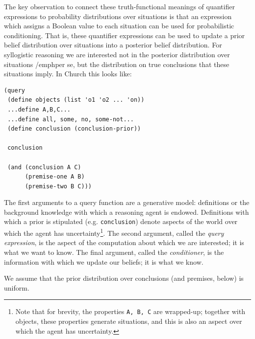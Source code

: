 \documentclass[10pt,letterpaper]{article}
\begin{document}
The key observation to connect these truth-functional meanings of quantifier expressions to probability distributions over situations is that an expression which assigns a Boolean value to each situation can be used for probabilistic conditioning. That is, these quantifier expressions can be used to update a prior belief distribution over situations into a posterior belief distribution. For syllogistic reasoning we are interested not in the posterior distribution over situations /emph{per se}, but the distribution on true conclusions that these situations imply. In Church this looks like:
\begin{lstlisting}
(query
 (define objects (list 'o1 'o2 ... 'on))
 ...define A,B,C...
 ...define all, some, no, some-not...
 (define conclusion (conclusion-prior))
 
 conclusion
 
 (and (conclusion A C) 
      (premise-one A B)
      (premise-two B C)))
\end{lstlisting}

The first arguments to a query function are a generative model: definitions or the background knowledge with which a reasoning agent is endowed. Definitions with which a prior is stipulated (e.g. \lstinline{conclusion}) denote aspects of the world over which the agent has uncertainty\footnote{Note that for brevity, the properties \lstinline{A, B, C} are wrapped-up; together with objects, these properties generate situations, and this is also an aspect over which the agent has uncertainty.}. The second argument, called the \emph{query expression}, is the aspect of the computation about which we are interested; it is what we want to know. The final argument, called the \emph{conditioner}, is the information with which we update our beliefs; it is what we know. 

We assume that the prior distribution over conclusions (and premises, below) is uniform.

%
%  
%  
\end{document}
